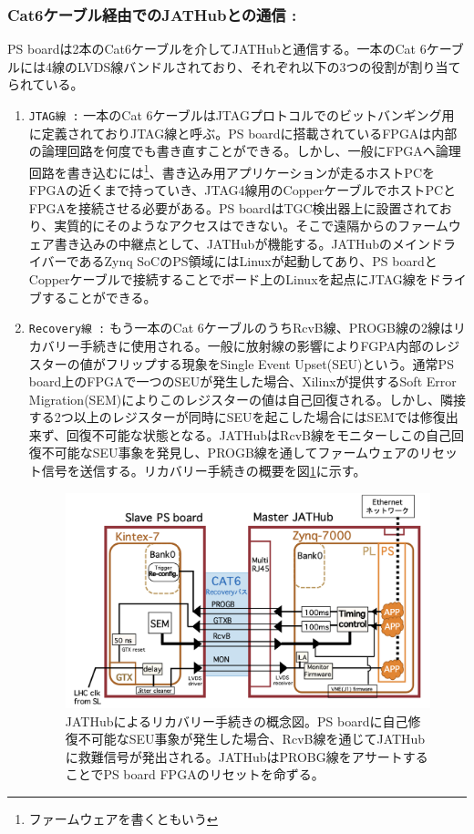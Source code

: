 \subsubsection{Cat6ケーブル経由でのJATHubとの通信 :}\par
 PS boardは2本のCat6ケーブルを介してJATHubと通信する。一本のCat 6ケーブルには4線のLVDS線バンドルされており、それぞれ以下の3つの役割が割り当てられている。

\begin{enumerate}
    \item \texttt{JTAG線 :} 一本のCat 6ケーブルはJTAGプロトコルでのビットバンギング用に定義されておりJTAG線と呼ぶ。PS boardに搭載されているFPGAは内部の論理回路を何度でも書き直すことができる。しかし、一般にFPGAへ論理回路を書き込むには\footnote{ファームウェアを書くともいう}、書き込み用アプリケーションが走るホストPCをFPGAの近くまで持っていき、JTAG4線用のCopperケーブルでホストPCとFPGAを接続させる必要がある。PS boardはTGC検出器上に設置されており、実質的にそのようなアクセスはできない。そこで遠隔からのファームウェア書き込みの中継点として、JATHubが機能する。JATHubのメインドライバーであるZynq SoCのPS領域にはLinuxが起動してあり、PS boardとCopperケーブルで接続することでボード上のLinuxを起点にJTAG線をドライブすることができる。
    \baselineskip


    \item \texttt{Recovery線 :} もう一本のCat 6ケーブルのうちRcvB線、PROGB線の2線はリカバリー手続きに使用される。一般に放射線の影響によりFGPA内部のレジスターの値がフリップする現象をSingle Event Upset(SEU)という。通常PS board上のFPGAで一つのSEUが発生した場合、Xilinxが提供するSoft Error Migration(SEM)によりこのレジスターの値は自己回復される。しかし、隣接する2つ以上のレジスターが同時にSEUを起こした場合にはSEMでは修復出来ず、回復不可能な状態となる。JATHubはRcvB線をモニターしこの自己回復不可能なSEU事象を発見し、PROGB線を通してファームウェアのリセット信号を送信する。リカバリー手続きの概要を図\ref{JATHubsem}に示す。
    \baselineskip
    \begin{figure} 
    \centering
    \includegraphics[width=16cm]{fig/JATHubsem.png}
    \caption[JATHubによるリカバリー手続き]{JATHubによるリカバリー手続きの概念図。PS boardに自己修復不可能なSEU事象が発生した場合、RcvB線を通じてJATHubに救難信号が発出される。JATHubはPROBG線をアサートすることでPS board FPGAのリセットを命ずる。}
    \label{JATHubsem}
    \end{figure}
    

\end{enumerate}
